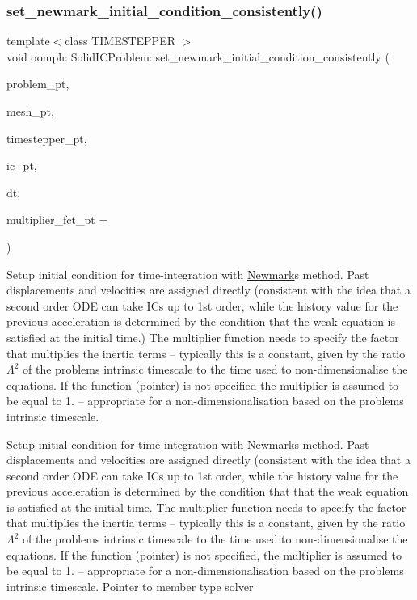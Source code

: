 \subsubsection{\texorpdfstring{set\+\_\+newmark\+\_\+initial\+\_\+condition\+\_\+consistently()}{set\_newmark\_initial\_condition\_consistently()}}
{\footnotesize\ttfamily template$<$class T\+I\+M\+E\+S\+T\+E\+P\+P\+ER $>$ \\
void oomph\+::\+Solid\+I\+C\+Problem\+::set\+\_\+newmark\+\_\+initial\+\_\+condition\+\_\+consistently (\begin{DoxyParamCaption}\item[{\hyperlink{classoomph_1_1Problem}{Problem} $\ast$}]{problem\+\_\+pt,  }\item[{\hyperlink{classoomph_1_1Mesh}{Mesh} $\ast$}]{mesh\+\_\+pt,  }\item[{T\+I\+M\+E\+S\+T\+E\+P\+P\+ER $\ast$}]{timestepper\+\_\+pt,  }\item[{\hyperlink{classoomph_1_1SolidInitialCondition}{Solid\+Initial\+Condition} $\ast$}]{ic\+\_\+pt,  }\item[{const double \&}]{dt,  }\item[{\hyperlink{classoomph_1_1SolidFiniteElement_a1ec1cdf98041a51f77aab2b892856fc4}{Solid\+Finite\+Element\+::\+Multiplier\+Fct\+Pt}}]{multiplier\+\_\+fct\+\_\+pt = {} }\end{DoxyParamCaption})}



Setup initial condition for time-\/integration with \hyperlink{classoomph_1_1Newmark}{Newmark}\textquotesingle{}s method. Past displacements and velocities are assigned directly (consistent with the idea that a second order O\+DE can take I\+Cs up to 1st order, while the history value for the previous acceleration is determined by the condition that the weak equation is satisfied at the initial time.) The multiplier function needs to specify the factor that multiplies the inertia terms -- typically this is a constant, given by the ratio $ \Lambda^2 $ of the problem\textquotesingle{}s intrinsic timescale to the time used to non-\/dimensionalise the equations. If the function (pointer) is not specified the multiplier is assumed to be equal to 1. -- appropriate for a non-\/dimensionalisation based on the problem\textquotesingle{}s intrinsic timescale. 

Setup initial condition for time-\/integration with \hyperlink{classoomph_1_1Newmark}{Newmark}\textquotesingle{}s method. Past displacements and velocities are assigned directly (consistent with the idea that a second order O\+DE can take I\+Cs up to 1st order, while the history value for the previous acceleration is determined by the condition that that the weak equation is satisfied at the initial time. The multiplier function needs to specify the factor that multiplies the inertia terms -- typically this is a constant, given by the ratio $ \Lambda^2 $ of the problem\textquotesingle{}s intrinsic timescale to the time used to non-\/dimensionalise the equations. If the function (pointer) is not specified, the multiplier is assumed to be equal to 1. -- appropriate for a non-\/dimensionalisation based on the problem\textquotesingle{}s intrinsic timescale. Pointer to member type solver 

